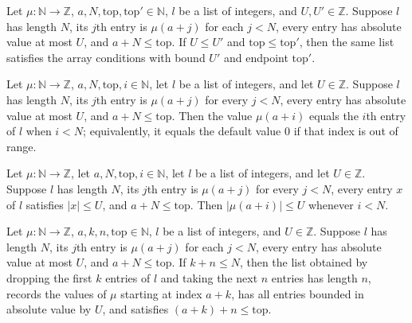 \begin{theorem}
\label{Light.ArrayAt.mono}
\leanok
{}
Let $\mu:\mathbb{N}\to\mathbb{Z}$, $a,N,\mathrm{top},\mathrm{top}'\in\mathbb{N}$, $l$ be
a list of integers, and $U,U'\in\mathbb{Z}$. Suppose $l$ has length $N$, its $j$th entry
is $\mu(a+j)$ for each $j<N$, every entry has absolute value at most $U$, and
$a+N\le\mathrm{top}$. If $U\le U'$ and $\mathrm{top}\le\mathrm{top}'$, then the same
list satisfies the array conditions with bound $U'$ and endpoint $\mathrm{top}'$.
\end{theorem}

\begin{theorem}
\label{Light.ArrayAt.read}
\leanok
{}
Let $\mu:\mathbb{N}\to\mathbb{Z}$, $a,N,\mathrm{top},i\in\mathbb{N}$, let $l$ be a list
of integers, and let $U\in\mathbb{Z}$. Suppose $l$ has length $N$, its $j$th entry is
$\mu(a+j)$ for every $j<N$, every entry has absolute value at most $U$, and
$a+N\le\mathrm{top}$. Then the value $\mu(a+i)$ equals the $i$th entry of $l$ when
$i<N$; equivalently, it equals the default value $0$ if that index is out of range.
\end{theorem}

\begin{theorem}
\label{Light.ArrayAt.abs_read_le}
\leanok
{}
Let $\mu:\mathbb{N}\to\mathbb{Z}$, let $a,N,\mathrm{top},i\in\mathbb{N}$, let $l$ be a
list of integers, and let $U\in\mathbb{Z}$. Suppose $l$ has length $N$, its $j$th entry
is $\mu(a+j)$ for every $j<N$, every entry $x$ of $l$ satisfies $|x|\le U$, and
$a+N\le\mathrm{top}$. Then $|\mu(a+i)|\le U$ whenever $i<N$.
\end{theorem}

\begin{theorem}
\label{Light.ArrayAt.drop_take}
\leanok
{}
Let $\mu:\mathbb{N}\to\mathbb{Z}$, $a,k,n,\mathrm{top}\in\mathbb{N}$, $l$ be a list of
integers, and $U\in\mathbb{Z}$. Suppose $l$ has length $N$, its $j$th entry is
$\mu(a+j)$ for each $j<N$, every entry has absolute value at most $U$, and
$a+N\le\mathrm{top}$. If $k+n\le N$, then the list obtained by dropping the first $k$
entries of $l$ and taking the next $n$ entries has length $n$, records the values of
$\mu$ starting at index $a+k$, has all entries bounded in absolute value by $U$, and
satisfies $(a+k)+n\le\mathrm{top}$.
\end{theorem}


